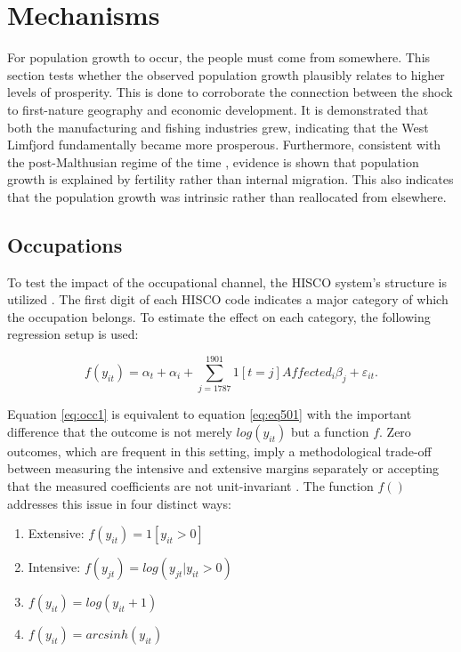 \documentclass[11pt]{article}
\begin{document}
\FloatBarrier
\section{Mechanisms}

For population growth to occur, the people must come from somewhere. This section tests whether the observed population growth plausibly relates to higher levels of prosperity. This is done to corroborate the connection between the shock to first-nature geography and economic development. It is demonstrated that both the manufacturing and fishing industries grew, indicating that the West Limfjord fundamentally became more prosperous. Furthermore, consistent with the post-Malthusian regime of the time \citep{Jensen2022, Klemp2016}, evidence is shown that population growth is explained by fertility rather than internal migration. This also indicates that the population growth was intrinsic rather than reallocated from elsewhere.

\subsection{Occupations}
To test the impact of the occupational channel, the HISCO system's structure is utilized \citep{leeuwen2002hisco}. The first digit of each HISCO code indicates a major category of which the occupation belongs. To estimate the effect on each category, the following regression setup is used:

\begin{equation}
\label{eq:occ1}
f(y_{it})= \alpha_t + \alpha_i + \sum_{j=1787}^{1901} 1[t=j]Affected_{i}\beta_{j} + \varepsilon_{it}.
\end{equation}

Equation \ref{eq:occ1} is equivalent to equation \ref{eq:eq501} with the important difference that the outcome is not merely $log(y_{it})$ but a function $f$. Zero outcomes, which are frequent in this setting, imply a methodological trade-off between measuring the intensive and extensive margins separately or accepting that the measured coefficients are not unit-invariant \citep{roth2023loglike}. The function $f()$ addresses this issue in four distinct ways:

\begin{enumerate}
    \item Extensive: $f(y_{it}) = 1[y_{it}>0]$
    \item Intensive: $f(y_{jt}) = log(y_{jt}|y_{it}>0)$
    \item $f(y_{it}) = log(y_{it}+1)$
    \item $f(y_{it}) = arcsinh(y_{it})$
\end{enumerate}
\end{document}
